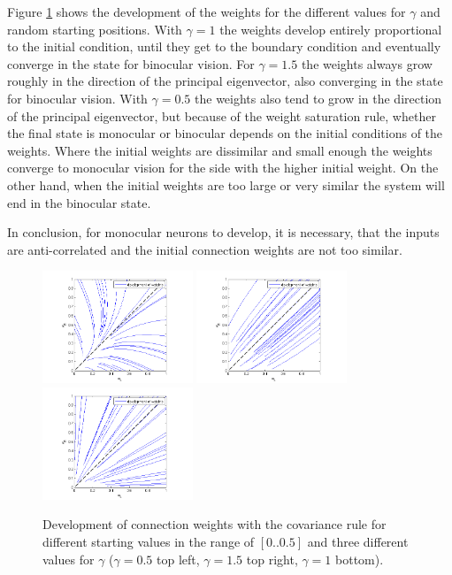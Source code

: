 \documentclass{scrartcl}
\begin{document}
Figure \ref{cov} shows the development of the weights for the different values for $\gamma$ and random starting positions. With $\gamma = 1$ the weights develop entirely proportional to the initial condition, until they get to the boundary condition and eventually converge in the state for binocular vision. For $\gamma = 1.5$ the weights always grow roughly in the direction of the principal eigenvector, also converging in the state for binocular vision. With $\gamma = 0.5$ the weights also tend to grow in the direction of the principal eigenvector, but because of the weight saturation rule, whether the final state is monocular or binocular depends on the initial conditions of the weights. Where the initial weights are dissimilar and small enough the weights converge to monocular vision for the side with the higher initial weight. On the other hand, when the initial weights are too large or very similar the system will end in the binocular state.

In conclusion, for monocular neurons to develop, it is necessary, that the inputs are anti-correlated and the initial connection weights are not too similar.

\begin{figure}
\centering
\includegraphics[trim = {1.8cm 0 2.5cm 0.4cm}, width=0.4\textwidth, clip]{../pics/g1t1}
\includegraphics[trim = {1.8cm 0 2.5cm 0.4cm}, width=0.4\textwidth, clip]{../pics/g3t1}
\includegraphics[trim = {1.8cm 0 2.5cm 0.4cm}, width=0.4\textwidth, clip]{../pics/g2t1}
\caption{Development of connection weights with the covariance rule for different starting values in the range of $[0..0.5]$ and three different values for $\gamma$ ($\gamma = 0.5$ top left, $\gamma = 1.5$ top right, $\gamma = 1$ bottom).}
\label{cov}
\end{figure}
\end{document}
